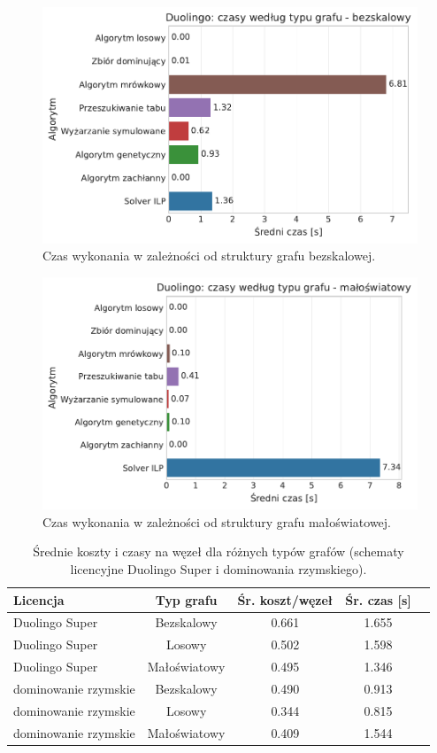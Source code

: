 \begin{figure}[H]
  \centering
  \includegraphics[width=0.65\linewidth]{assets/figures/benchmark/synthetic/duolingo_time_by_graph_scale_free.pdf}
  \caption{Czas wykonania w zależności od struktury grafu bezskalowej.}
  \label{fig:duo-synth-time-scale-free}
\end{figure}

\begin{figure}[H]
  \centering
  \includegraphics[width=0.65\linewidth]{assets/figures/benchmark/synthetic/duolingo_time_by_graph_small_world.pdf}
  \caption{Czas wykonania w zależności od struktury grafu małoświatowej.}
  \label{fig:duo-synth-time-small-world}
\end{figure}

\begin{table}[H]
  \centering
  \caption{Średnie koszty i czasy na węzeł dla różnych typów grafów (schematy licencyjne Duolingo Super i dominowania rzymskiego).}
  \label{tab:duo-synth-summary-times}
  \begin{tabular}{lcccc}
    \toprule
    \textbf{Licencja}    & \textbf{Typ grafu} & \textbf{Śr. koszt/węzeł} & \textbf{Śr. czas [s]} \\
    \midrule
    Duolingo Super       & Bezskalowy         & 0.661                    & 1.655                 \\
    Duolingo Super       & Losowy             & 0.502                    & 1.598                 \\
    Duolingo Super       & Małoświatowy       & 0.495                    & 1.346                 \\
    dominowanie rzymskie & Bezskalowy         & 0.490                    & 0.913                 \\
    dominowanie rzymskie & Losowy             & 0.344                    & 0.815                 \\
    dominowanie rzymskie & Małoświatowy       & 0.409                    & 1.544                 \\
    \bottomrule
  \end{tabular}
\end{table}


